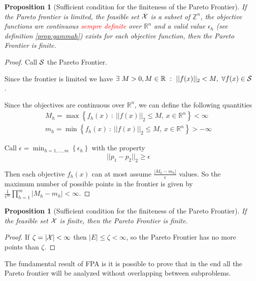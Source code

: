 \documentclass{article}
\newcommand{\red}[1]{\textcolor{red}{#1}}
\newtheorem{proposition}[theorem]{Proposition}
\def\setR{\mathbb{R}}
\def\setRn{\mathbb{R}^n}
\def\setZn{\mathbb{Z}^n}
\def\ds{\displaystyle}
\def\X{{\cal X}}
\begin{document}
	    \begin{proposition}[Sufficient condition for the finiteness of the Pareto Frontier]
	    	If the Pareto frontier is limited, the feasible set $\X$ is a subset of $\setZn$, the objective functions are continuous \red{sempre definite} over $\setRn$  and a valid value $\epsilon_h$ (see definition \ref{prop:gammah}) exists for each objective function, then the Pareto Frontier is finite.
	    \end{proposition} 
	    \begin{proof}
	    	Call $\cal S$ the Pareto Frontier.
	    	
	    	Since the frontier is limited we have $\ds \exists\ M>0, M \in \setR \ : \ ||f(x)||_2 < M, \ \forall f(x) \in \cal S$.
	    	
	    	Since the objectives are continuous over $\setRn$, we can define the following quantities 
	    	$$
	    	\begin{array}{l}
	    	  M_h = \ds \max \left\{ f_h(x) \ :\  ||f(x)||_2 \le M, \ x \in \setRn \right\} < \infty\\
	    	  m_h = \ds \min \left\{ f_h(x) \ :\  ||f(x)||_2 \le M, \ x \in \setRn \right\} > -\infty
	    	\end{array}
	    	$$
	    	
	      Call $\epsilon = \ds \min_{h=1,\dots,m}\left\{ \epsilon_h\right\}	$ with the property 
	      $$ ||p_1 - p_2||_2 \ge \epsilon$$
	      
	      
	      Then each objective $f_h(x)$ can at most assume $\ds \frac{|M_h - m_h|}{\epsilon}$ values. So the maximum number of possible points in the frontier is given by $\ds \frac{1}{\epsilon^m} \prod_{h=1}^m  |M_h - m_h| < \infty$.
	    \end{proof}
	    
	    \begin{proposition}[Sufficient condition for the finiteness of the Pareto Frontier]
	    	If the feasible set $\X$ is finite, then the Pareto Frontier is finite.
	    \end{proposition}
	    \begin{proof}
	    	If $\zeta = \left\lvert \X \right\rvert < \infty$ then $\left\lvert E \right\rvert \le \zeta < \infty$, so the Pareto Frontier has no more points  than $\zeta$.
	    \end{proof}
	    \medskip
	    
	    
	    The fundamental result of FPA is it is possible to prove that in the end all the Pareto frontier will be analyzed without overlapping between subproblems.
	    
\end{document}
